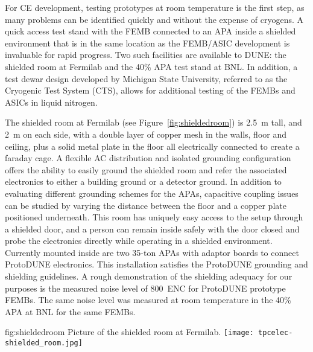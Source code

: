 For CE development, testing prototypes at room temperature is the first step, as many problems can be identified quickly and without the expense of cryogens.  A quick access test stand with the FEMB connected to an APA inside a shielded environment that is in the same location as the FEMB/ASIC development is invaluable for rapid progress.  Two such facilities are available to DUNE: the shielded room at Fermilab and the 40\% APA test stand at BNL.  In addition, a test dewar design developed by Michigan State University, referred to as the Cryogenic Test System (CTS), allows for additional testing of the FEMBs and ASICs in liquid nitrogen.

The shielded room at Fermilab (see Figure~\ref{fig:shieldedroom}) is 2.5~m tall, and 2~m on each side, with 
a double layer of copper mesh in the walls, floor and ceiling, plus a solid metal plate in the floor all electrically connected to create a faraday cage.  A flexible AC distribution and isolated grounding configuration offers the ability to easily ground the shielded room and refer the associated electronics to either a building ground or a detector ground.  In addition
to evaluating different grounding schemes for the APAs, capacitive coupling issues can be studied by varying the
distance between the floor and a copper plate positioned underneath.   
This room has uniquely easy access to the setup through a shielded door,
and a person can remain inside safely with the door closed and probe the electronics directly while operating
in a shielded environment.  Currently mounted inside are two 35-ton APAs 
with adaptor boards to connect ProtoDUNE electronics.  This installation satisfies the ProtoDUNE grounding and shielding guidelines.  A rough demonstration of the shielding adequacy for our purposes  is the measured noise level of 800~ENC for ProtoDUNE prototype FEMBs.  The same noise level was measured at room temperature in the 40\% APA at BNL for the same FEMBs.

\begin{dunefigure}
{fig:shieldedroom}
{Picture of the shielded room at Fermilab.}
\texttt{[image: tpcelec-shielded\_room.jpg]}
\end{dunefigure}

